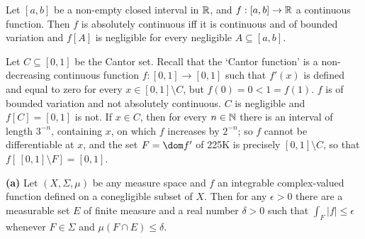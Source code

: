 
 Let $[a,b]$ be a non-empty closed interval in
$\Bbb R$, and $f:[a,b]\to\Bbb R$ a continuous function.   Then $f$ is
absolutely continuous iff it is continuous and of bounded variation and
$f[A]$ is negligible for every negligible $A\subseteq[a,b]$.


   Let $C\subseteq[0,1]$ be the Cantor
set.
Recall that the `Cantor function' is a non-decreasing continuous
function $f:[0,1]\to[0,1]$ such that $f'(x)$ is defined and equal to
zero for every $x\in[0,1]\setminus C$,
but $f(0)=0<1=f(1)$.    $f$ is of bounded variation and not absolutely continuous.   $C$
is negligible and $f[C]=[0,1]$ is not.   If $x\in C$, then for every
$n\in\Bbb N$ there is an interval of length $3^{-n}$, containing $x$, on
which $f$ increases by $2^{-n}$;  so $f$ cannot be differentiable at
$x$, and the set $F=\dom f'$ of 225K is precisely $[0,1]\setminus C$, so
that $f[\,[0,1]\setminus F]=[0,1]$.

 {\bf (a)} Let
$(X,\Sigma,\mu)$ be any measure space and $f$ an integrable
complex-valued
function defined on a conegligible subset of $X$.
Then for any $\epsilon>0$ there are a measurable set
$E$ of finite measure and a real number
$\delta>0$ such that $\int_F|f|\le\epsilon$ whenever $F\in\Sigma$ and
$\mu(F\cap E)\le\delta$.  


